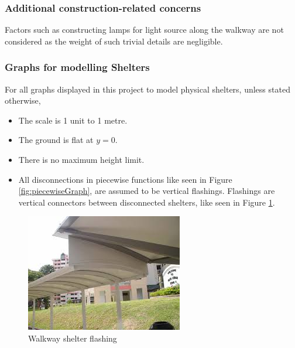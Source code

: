 \documentclass[a4paper,titlepage]{article}
\begin{document}
\subsubsection{Additional construction-related concerns}

Factors such as constructing lamps for light source along the walkway are not considered as the weight of such trivial details are negligible.

\subsubsection{Graphs for modelling Shelters}

For all graphs displayed in this project to model physical shelters, unless stated otherwise,
\begin{itemize}
    \item The scale is 1 unit to 1 metre.
    \item The ground is flat at $y=0$.
    \item There is no maximum height limit.
    \item All disconnections in piecewise functions like seen in Figure \ref{fig:piecewiseGraph}, are assumed to be vertical flashings. Flashings are vertical connectors between disconnected shelters, like seen in Figure \ref{fig:flashingExample}.
\end{itemize}

\begin{figure}[htbp]
    \centering
    \includegraphics[width=\textwidth]{flashingExample.jpeg}
    \caption{Walkway shelter flashing}
    \label{fig:flashingExample}
\end{figure}
\end{document}
